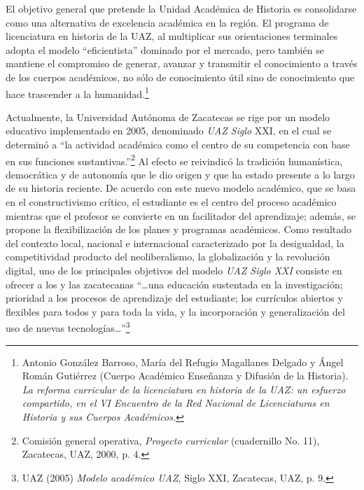El objetivo general que pretende la Unidad Académica de Historia es
consolidarse como una alternativa de excelencia académica en la región.
 {El programa de licenciatura en historia de la UAZ,  al
multiplicar sus orientaciones terminales adopta el modelo “eficientista”
dominado por el mercado, pero también se mantiene el compromiso de generar,
avanzar y transmitir el conocimiento a través de los cuerpos académicos, no
sólo de conocimiento útil sino de conocimiento que hace trascender  a la
humanidad.}\footnote{Antonio
González Barroso, María del Refugio Magallanes Delgado y Ángel Román
Gutiérrez (Cuerpo Académico Enseñanza y Difusión de la Historia).
\textit{La reforma curricular de la licenciatura en historia de la UAZ: un
esfuerzo compartido, en el }\textit{VI Encuentro de la Red Nacional de
Licenciaturas en Historia y sus Cuerpos Académicos.}}

Actualmente, la Universidad Autónoma de Zacatecas se rige por un modelo 
educativo implementado en 2005, denominado \textit{UAZ Siglo }XXI, en 
el cual se determinó a “la actividad académica como el centro de su 
competencia con base en sus funciones sustantivas.”\footnote{Comisión 
general operativa, \textit{Proyecto curricular} (cuadernillo No. 11), 
Zacatecas, UAZ, 2000, p. 4.} Al efecto se reivindicó la tradición 
humanística, democrática y de autonomía que le dio origen y que ha 
estado presente a lo largo de su historia reciente. De acuerdo con este 
nuevo modelo académico, que se basa en el constructivismo crítico, el 
estudiante es el centro del proceso académico mientras que el profesor 
se convierte en un facilitador del aprendizaje; además, se propone la 
flexibilización de los planes y programas académicos. Como resultado 
del contexto local, nacional e internacional caracterizado por la 
desigualdad, la competitividad producto del neoliberalismo, la 
globalización y la revolución digital, uno de los principales objetivos 
del modelo \textit{UAZ Siglo XXI }consiste en ofrecer a los y las 
zacatecanas “…una educación sustentada en la investigación; prioridad a 
los procesos de aprendizaje del estudiante; los currículos abiertos y 
flexibles para todos y para toda la vida, y la incorporación y 
generalización del uso de nuevas tecnologías…”\footnote{UAZ 
(2005)\textit{ Modelo académico UAZ}, Siglo XXI, Zacatecas, UAZ, p. 9.}


%